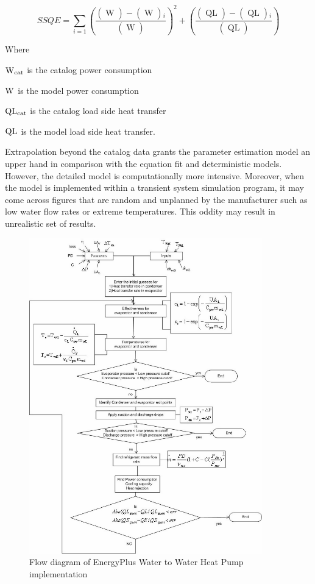 \begin{equation}
SSQE = \sum\limits_{i = 1} {{{\left( {\frac{{\left( {\mathop {W{}_{cat}}\limits^{} } \right) - \left( {\mathop W\limits^{} } \right){}_i}}{{\left( {\mathop {W{}_{cat}}\limits^{} } \right)}}} \right)}^2}}  + \left( {\frac{{\left( {\mathop {QL{}_{cat}}\limits^{} } \right) - \left( {\mathop {QL}\limits^{} } \right){}_i}}{{\left( {\mathop {QL{}_{cat}}\limits^{} } \right)}}} \right)
\end{equation}

Where

\({\rm{W}}{}_{{\rm{cat}}}\) is the catalog power consumption

\({\rm{W}}{}_{}\) is the model power consumption

\({\rm{QL}}{}_{{\rm{cat}}}\) is the catalog load side heat transfer

\({\rm{QL}}{}_{}\) is the model load side heat transfer.

Extrapolation beyond the catalog data grants the parameter estimation model an upper hand in comparison with the equation fit and deterministic models. However, the detailed model is computationally more intensive. Moreover, when the model is implemented within a transient system simulation program, it may come across figures that are random and unplanned by the manufacturer such as low water flow rates or extreme temperatures. This oddity may result in unrealistic set of results.

\begin{figure}[hbtp] %
\centering
\includegraphics[width=0.9\textwidth, height=0.9\textheight, keepaspectratio=true]{media/image5314.png}
\caption{Flow diagram of EnergyPlus Water to Water Heat Pump implementation \protect \label{fig:flow-diagram-of-energyplus-water-to-water}}
\end{figure}

